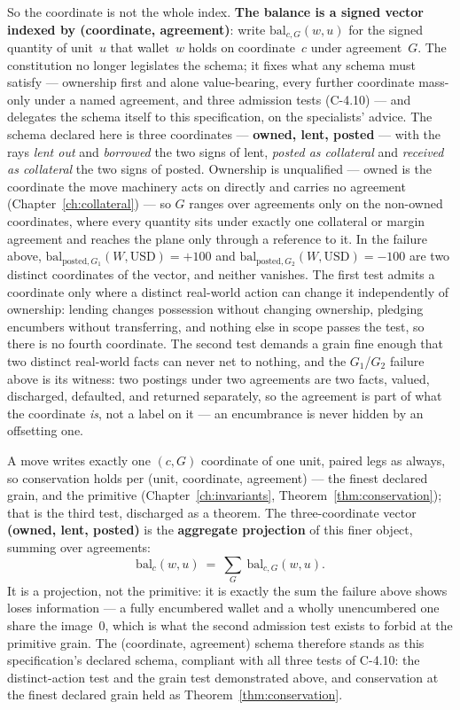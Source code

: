 \documentclass[11pt,a4paper]{article}
\begin{document}
So the coordinate is not the whole index. \textbf{The balance is a signed vector indexed
by (coordinate, agreement)}: write $\mathrm{bal}_{c,G}(w,u)$ for the signed quantity of
unit~$u$ that wallet~$w$ holds on coordinate~$c$ under agreement~$G$. The constitution no
longer legislates the schema; it fixes what any schema must satisfy --- ownership first
and alone value-bearing, every further coordinate mass-only under a named agreement, and
three admission tests (C-4.10) --- and delegates the schema itself to this specification,
on the specialists' advice. The schema declared here is three coordinates ---
\textbf{owned, lent, posted} --- with the rays \emph{lent out} and \emph{borrowed} the
two signs of lent, \emph{posted as collateral} and \emph{received as collateral} the two
signs of posted.
Ownership is unqualified --- owned is the coordinate the move machinery acts on directly
and carries no agreement (Chapter~\ref{ch:collateral}) --- so $G$ ranges over agreements
only on the non-owned coordinates, where every quantity sits under exactly one collateral
or margin agreement and reaches the plane only through a reference to it. In the failure
above, $\mathrm{bal}_{\text{posted},G_1}(W,\text{USD})=+100$ and
$\mathrm{bal}_{\text{posted},G_2}(W,\text{USD})=-100$ are two distinct coordinates of the
vector, and neither vanishes. The first test admits a coordinate only where a distinct
real-world action can change it independently of ownership: lending changes possession
without changing ownership, pledging encumbers without transferring, and nothing else in
scope passes the test, so there is no fourth coordinate. The second test demands a grain
fine enough that two distinct real-world facts can never net to nothing, and the
$G_1$/$G_2$ failure above is its witness: two postings under two agreements are two
facts, valued, discharged, defaulted, and returned separately, so the agreement is part
of what the coordinate \emph{is}, not a label on it --- an encumbrance is never hidden by
an offsetting one.

A move writes exactly one $(c,G)$ coordinate of one unit, paired legs as always, so
conservation holds per (unit, coordinate, agreement) --- the finest declared grain, and
the primitive (Chapter~\ref{ch:invariants}, Theorem~\ref{thm:conservation}); that is the
third test, discharged as a theorem. The three-coordinate vector \textbf{(owned, lent,
posted)} is the \textbf{aggregate projection} of this finer object, summing over
agreements:
\[
\mathrm{bal}_c(w,u)\ =\ \sum_{G}\ \mathrm{bal}_{c,G}(w,u).
\]
It is a projection, not the primitive: it is exactly the sum the failure above shows loses
information --- a fully encumbered wallet and a wholly unencumbered one share the
image~$0$, which is what the second admission test exists to forbid at the primitive
grain. The (coordinate, agreement) schema therefore stands as this specification's
declared schema, compliant with all three tests of C-4.10: the distinct-action test and
the grain test demonstrated above, and conservation at the finest declared grain held as
Theorem~\ref{thm:conservation}.
\end{document}
